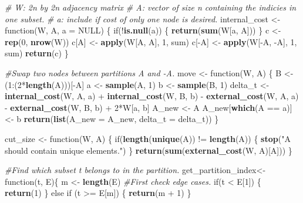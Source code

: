 \documentclass[11pt,]{article}
\newenvironment{Shaded}{\begin{snugshade}}{\end{snugshade}}
\newcommand{\KeywordTok}[1]{\textcolor[rgb]{0.13,0.29,0.53}{\textbf{{#1}}}}
\newcommand{\DataTypeTok}[1]{\textcolor[rgb]{0.13,0.29,0.53}{{#1}}}
\newcommand{\DecValTok}[1]{\textcolor[rgb]{0.00,0.00,0.81}{{#1}}}
\newcommand{\StringTok}[1]{\textcolor[rgb]{0.31,0.60,0.02}{{#1}}}
\newcommand{\CommentTok}[1]{\textcolor[rgb]{0.56,0.35,0.01}{\textit{{#1}}}}
\newcommand{\OtherTok}[1]{\textcolor[rgb]{0.56,0.35,0.01}{{#1}}}
\newcommand{\NormalTok}[1]{{#1}}
\begin{document}
\begin{Shaded}
\begin{Highlighting}[]
\CommentTok{# W: 2n by 2n adjacency matrix}
\CommentTok{# A: vector of size n containing the indicies in one subset.}
\CommentTok{# a: include if cost of only one node is desired.}
\NormalTok{internal_cost <-}\StringTok{ }\NormalTok{function(W, A, }\DataTypeTok{a =} \OtherTok{NULL}\NormalTok{) \{}
  \NormalTok{if(!}\KeywordTok{is.null}\NormalTok{(a)) \{}
    \KeywordTok{return}\NormalTok{(}\KeywordTok{sum}\NormalTok{(W[a, A]))}
  \NormalTok{\}}
  \NormalTok{c <-}\StringTok{ }\KeywordTok{rep}\NormalTok{(}\DecValTok{0}\NormalTok{, }\KeywordTok{nrow}\NormalTok{(W))}
  \NormalTok{c[A] <-}\StringTok{ }\KeywordTok{apply}\NormalTok{(W[A, A], }\DecValTok{1}\NormalTok{, sum)}
  \NormalTok{c[-A] <-}\StringTok{ }\KeywordTok{apply}\NormalTok{(W[-A, -A], }\DecValTok{1}\NormalTok{, sum)}
  \KeywordTok{return}\NormalTok{(c)}
\NormalTok{\}}

\CommentTok{#Swap two nodes between partitions A and -A.}
\NormalTok{move <-}\StringTok{ }\NormalTok{function(W, A) \{}
  \NormalTok{B <-}\StringTok{ }\NormalTok{(}\DecValTok{1}\NormalTok{:(}\DecValTok{2}\NormalTok{*}\KeywordTok{length}\NormalTok{(A)))[-A]}
  \NormalTok{a <-}\StringTok{ }\KeywordTok{sample}\NormalTok{(A, }\DecValTok{1}\NormalTok{)}
  \NormalTok{b <-}\StringTok{ }\KeywordTok{sample}\NormalTok{(B, }\DecValTok{1}\NormalTok{)}
  \NormalTok{delta_t <-}\StringTok{ }\KeywordTok{internal_cost}\NormalTok{(W, A, a) +}\StringTok{ }
\StringTok{    }\KeywordTok{internal_cost}\NormalTok{(W, B, b) -}\StringTok{ }\KeywordTok{external_cost}\NormalTok{(W, A, a) -}\StringTok{ }
\StringTok{    }\KeywordTok{external_cost}\NormalTok{(W, B, b) +}\StringTok{ }\DecValTok{2}\NormalTok{*W[a, b]}
  \NormalTok{A_new <-}\StringTok{ }\NormalTok{A}
  \NormalTok{A_new[}\KeywordTok{which}\NormalTok{(A ==}\StringTok{ }\NormalTok{a)] <-}\StringTok{ }\NormalTok{b}
  \KeywordTok{return}\NormalTok{(}\KeywordTok{list}\NormalTok{(}\DataTypeTok{A_new =} \NormalTok{A_new, }\DataTypeTok{delta_t =} \NormalTok{delta_t))}
\NormalTok{\}}

\NormalTok{cut_size <-}\StringTok{ }\NormalTok{function(W, A) \{}
  \NormalTok{if(}\KeywordTok{length}\NormalTok{(}\KeywordTok{unique}\NormalTok{(A)) !=}\StringTok{ }\KeywordTok{length}\NormalTok{(A)) \{}
    \KeywordTok{stop}\NormalTok{(}\StringTok{"A should contain unique elements."}\NormalTok{)}
  \NormalTok{\}}
  \KeywordTok{return}\NormalTok{(}\KeywordTok{sum}\NormalTok{(}\KeywordTok{external_cost}\NormalTok{(W, A)[A]))}
\NormalTok{\}}

\CommentTok{#Find which subset t belongs to in the partition.}
\NormalTok{get_partition_index<-function(t, E)\{}
  \NormalTok{m <-}\StringTok{ }\KeywordTok{length}\NormalTok{(E)}
  \CommentTok{#First check edge cases.}
  \NormalTok{if(t <}\StringTok{ }\NormalTok{E[}\DecValTok{1}\NormalTok{]) \{}
    \KeywordTok{return}\NormalTok{(}\DecValTok{1}\NormalTok{)}
  \NormalTok{\} else if (t >=}\StringTok{ }\NormalTok{E[m]) \{}
    \KeywordTok{return}\NormalTok{(m +}\StringTok{ }\DecValTok{1}\NormalTok{)}
  \NormalTok{\} }
  

\end{Highlighting}
\end{Shaded}
\end{document}
